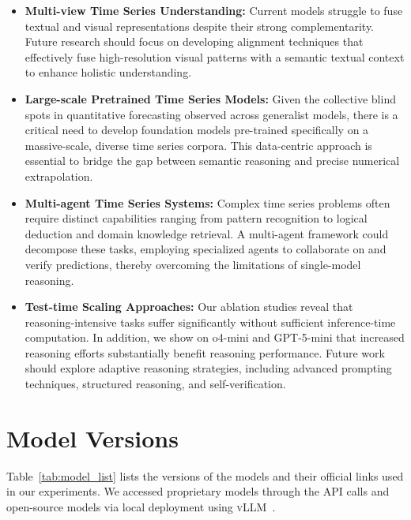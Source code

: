 \documentclass{article}
\theoremstyle{plain}
\theoremstyle{definition}
\theoremstyle{remark}
\theoremstyle{plain}
\begin{document}
\begin{itemize}
    \item \textbf{Multi-view Time Series Understanding:}
    Current models struggle to fuse textual and visual
    representations despite their strong complementarity.
    Future research should focus on developing alignment
    techniques that effectively fuse high-resolution visual
    patterns with a semantic textual context to enhance
    holistic understanding.

    \item \textbf{Large-scale Pretrained Time Series Models:}
    Given the collective blind spots in quantitative
    forecasting observed across generalist models, there is
    a critical need to develop foundation models
    pre-trained specifically on a massive-scale, diverse time
    series corpora. This data-centric approach is essential
    to bridge the gap between semantic reasoning and
    precise numerical extrapolation.

    \item \textbf{Multi-agent Time Series Systems:}
    Complex time series problems often require distinct
    capabilities ranging from pattern recognition to logical
    deduction and domain knowledge retrieval. A multi-agent framework could decompose these tasks,
    employing specialized agents to collaborate on and
    verify predictions, thereby overcoming the limitations
    of single-model reasoning.

    \item \textbf{Test-time Scaling Approaches:}
    Our ablation studies reveal that reasoning-intensive tasks suffer significantly without sufficient
    inference-time computation. In addition, we show on
    o4-mini and GPT-5-mini that increased reasoning
    efforts substantially benefit reasoning performance.
    Future work should explore adaptive reasoning
    strategies, including advanced prompting techniques, structured reasoning, and
    self-verification.
\end{itemize}



\section{Model Versions}
Table~\ref{tab:model_list} lists the versions of the models and their official links used in our experiments. We accessed proprietary models through the API calls and open-source models via local deployment using \textsc{vLLM}~\citep{kwon2023efficient}.
\end{document}
